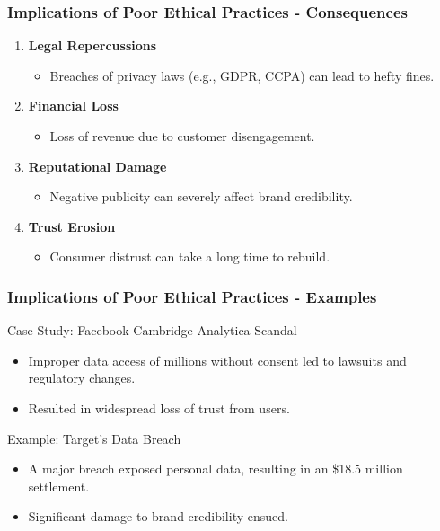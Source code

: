\documentclass[aspectratio=169]{beamer}
\begin{document}
\begin{frame}[fragile]
    \frametitle{Implications of Poor Ethical Practices - Consequences}
    \begin{enumerate}
        \item \textbf{Legal Repercussions}
            \begin{itemize}
                \item Breaches of privacy laws (e.g., GDPR, CCPA) can lead to hefty fines.
            \end{itemize}
        \item \textbf{Financial Loss}
            \begin{itemize}
                \item Loss of revenue due to customer disengagement.
            \end{itemize}
        \item \textbf{Reputational Damage}
            \begin{itemize}
                \item Negative publicity can severely affect brand credibility.
            \end{itemize}
        \item \textbf{Trust Erosion}
            \begin{itemize}
                \item Consumer distrust can take a long time to rebuild.
            \end{itemize}
    \end{enumerate}
\end{frame}

\begin{frame}[fragile]
    \frametitle{Implications of Poor Ethical Practices - Examples}
    \begin{block}{Case Study: Facebook-Cambridge Analytica Scandal}
        \begin{itemize}
            \item Improper data access of millions without consent led to lawsuits and regulatory changes.
            \item Resulted in widespread loss of trust from users.
        \end{itemize}
    \end{block}
    
    \begin{block}{Example: Target's Data Breach}
        \begin{itemize}
            \item A major breach exposed personal data, resulting in an \$18.5 million settlement.
            \item Significant damage to brand credibility ensued.
        \end{itemize}
    \end{block}
\end{frame}
\end{document}
